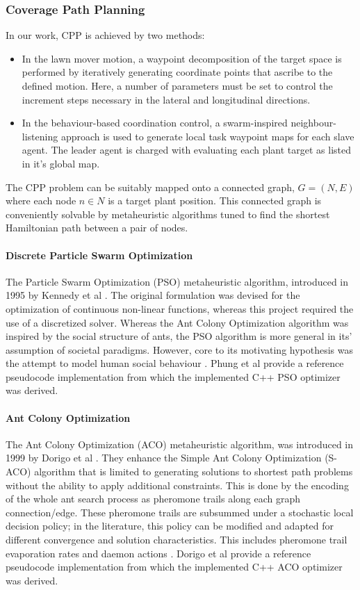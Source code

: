 \documentclass{report}
\begin{document}
\subsubsection{Coverage Path Planning}
In our work, CPP is achieved by two methods:
\begin{itemize}
	\item In the lawn mover motion, a waypoint decomposition of the target space is performed by iteratively generating coordinate points that ascribe to the defined motion. Here, a number of parameters must be set to control the increment steps necessary in the lateral and longitudinal directions.
	\item In the behaviour-based coordination control, a swarm-inspired neighbour-listening approach is used to generate local task waypoint maps for each slave agent. The leader agent is charged with evaluating each plant target as listed in it’s global map.
\end{itemize}

The CPP problem can be suitably mapped onto a connected graph, \textit{$G = (N, E)$} where each node \textit{$n \in N$} is a target plant position. This connected graph is conveniently solvable by metaheuristic algorithms tuned to find the shortest Hamiltonian path between a pair of nodes.

\paragraph{Discrete Particle Swarm Optimization}
The Particle Swarm Optimization (PSO) metaheuristic algorithm, introduced in 1995 by Kennedy et al \cite{Kennedy1995}. The original formulation was devised for the optimization of continuous non-linear functions, whereas this project required the use of a discretized solver. Whereas the Ant Colony Optimization algorithm was inspired by the social structure of ants, the PSO algorithm is more general in its' assumption of societal paradigms. However, core to its motivating hypothesis was the attempt to model human social behaviour \cite{Kennedy1995}. Phung et al \cite{Phung2017} provide a reference pseudocode implementation from which the implemented C++ PSO optimizer was derived.

\paragraph{Ant Colony Optimization}
The Ant Colony Optimization (ACO) metaheuristic algorithm, was introduced in 1999 by Dorigo et al \cite{Dorigo1999}. They enhance the Simple Ant Colony Optimization (S-ACO) algorithm that is limited to generating solutions to shortest path problems without the ability to apply additional constraints. This is done by the encoding of the whole ant search process as pheromone trails along each graph connection/edge. These pheromone trails are subsummed under a stochastic local decision policy; in the literature, this policy can be modified and adapted for different convergence and solution characteristics. This includes pheromone trail evaporation rates and daemon actions \cite{Dorigo1999}. Dorigo et al \cite{Dorigo1999} provide a reference pseudocode implementation from which the implemented C++ ACO optimizer was derived.
\end{document}
